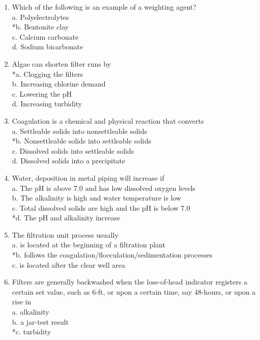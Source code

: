 \begin{enumerate}
\item	Which of the following is an example of a weighting agent?\\
a.	Polyelectrolytes\\
*b.	Bentonite clay\\
c.	Calcium carbonate\\
d.	Sodium bicarbonate\\
\item Algae can shorten filter runs by\\
*a.	Clogging the filters\\
b.	Increasing chlorine demand\\
c.	Lowering the pH\\
d.	Increasing turbidity\\
\item Coagulation is a chemical and physical reaction that converts\\
a.	Settleable solids into nonsettleable solids\\
*b.	Nonsettleable solids into settleable solids\\
c.	Dissolved solids into settleable solids\\
d.	Dissolved solids into a precipitate\\
\item Water, deposition in metal piping will increase if\\
a.	The pH is above 7.0 and has low dissolved oxygen levels\\
b.	The alkalinity is high and water temperature is low\\
c.	Total dissolved solids are high and the pH is below 7.0\\
*d.	The pH and alkalinity increase\\
\item The filtration unit process usually\\
a. is located at the beginning of a filtration plant\\
*b. follows the coagulation/flocculation/sedimentation processes\\
c. is located after the clear well area\\
\item Filters are generally backwashed when the loss-of-head indicator registers a certain set value, such as 6-ft, or upon a certain time, say 48-hours, or upon a rise in\\
a. alkalinity\\
b. a jar-test result\\
*c. turbidity\\

\end{enumerate}
